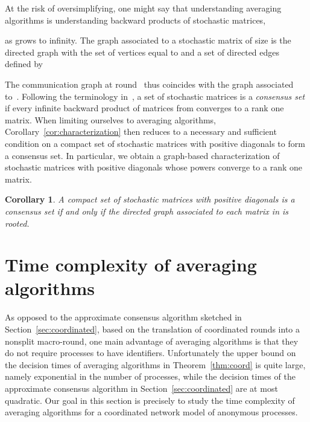 \documentclass[a4paper]{article}
\theoremstyle{newthm}
\newtheorem{cor}[thm]{Corollary}
\begin{document}
At the risk of oversimplifying, one might say that understanding averaging algorithms
	is understanding backward products of stochastic matrices,
	
	as  grows to infinity.
The graph associated to a stochastic matrix  of size  is the directed graph 
	with the set of vertices equal to   and a set of directed edges~ defined by 
	
The  communication graph at round~ thus coincides with the graph associated to~. 
Following the terminology in~\cite{BO13}, a set  of stochastic matrices is a {\em consensus set} 
	if every infinite backward product of matrices from  converges to a rank one matrix.
When limiting ourselves to averaging algorithms, Corollary~\ref{cor:characterization} then reduces to a
	necessary and sufficient condition on a compact set of stochastic matrices with positive diagonals
	 to form a consensus set.
In particular, we obtain a graph-based characterization of stochastic matrices with positive diagonals 
	whose powers converge to a rank one matrix.


\begin{cor}\label{cor:characterizationmath}
A compact set  of stochastic matrices with positive diagonals is a consensus set if and only if 
	the directed graph associated to each matrix in  is rooted.
\end{cor}

\section{Time complexity of averaging algorithms}

As opposed to the approximate consensus algorithm sketched in Section~\ref{sec:coordinated}, 
	based on the translation of coordinated rounds into a nonsplit  macro-round, 
	one main advantage of averaging algorithms is that they do not require processes to have identifiers. 
Unfortunately the upper bound on the decision times of averaging algorithms in Theorem~\ref{thm:coord} is quite large, 
	namely exponential in the number of processes, while the decision times of the approximate consensus algorithm  in Section~\ref{sec:coordinated} 
	are at most quadratic.
Our goal in this section is precisely to study the time complexity of averaging  algorithms for
	a coordinated network model of  anonymous processes.
		
\end{document}
